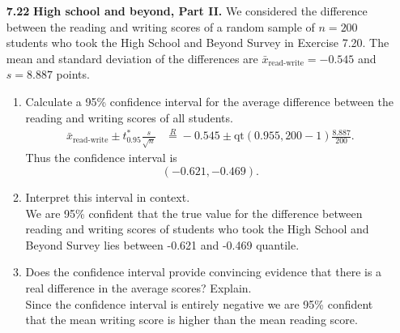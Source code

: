 \documentclass[a4paper, 12pt]{../../config/homework}
\begin{document}
\begin{enumerate}
\pagebreak
\item[\textbf{7.22}] \textbf{High school and beyond, Part II.} We considered the difference between the reading and writing scores of a random sample of \(n=200\) students who took the High School and Beyond Survey in Exercise 7.20. The mean and standard deviation of the differences are \(\bar{x}_{\text{read-write}}=-0.545\) and \(s=8.887\) points.
\begin{enumerate}[label=(\alph*)]
\item Calculate a 95\% confidence interval for the average difference between the reading and writing scores of all students.
\begin{align*}
\bar{x}_{\text{read-write}} \pm t^*_{0.95} \frac{s}{\sqrt{n}} &\overset{R}{=} -0.545 \pm \text{qt}(0.955, 200-1)\frac{8.887}{200}.
\end{align*}
Thus the confidence interval is
\[(-0.621, -0.469).\]
\item Interpret this interval in context.
\\We are 95\% confident that the true value for the difference between reading and writing scores of students who took the High School and Beyond Survey lies between -0.621 and -0.469 quantile.
\item Does the confidence interval provide convincing evidence that there is a real difference in the average scores? Explain.
\\Since the confidence interval is entirely negative we are 95\% confident that the mean writing score is higher than the mean reading score.
\end{enumerate}
\end{enumerate}
\end{document}
